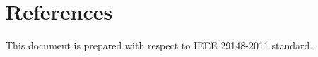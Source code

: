 \section{References}

This document is prepared with respect to IEEE 29148-2011 \cite{ieee29148} standard.

\printbibliography
